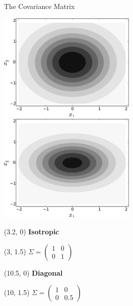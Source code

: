 \documentclass[pdf]{beamer}
\begin{document}
\begin{frame}{The Covariance Matrix}
\begin{center}
	\includegraphics[width=0.5\textwidth]{Gaussian2DContour1.pdf}
	\includegraphics[width=0.5\textwidth]{Gaussian2DContour2.pdf}
\end{center}

\begin{textblock}{8}(3.2, 0) %
\textbf{Isotropic}
\end{textblock}

\begin{textblock}{8}(3, 1.5) %
$\Sigma = 
\begin{pmatrix}
1 & 0\\
0 & 1
\end{pmatrix}
$
\end{textblock}

\begin{textblock}{8}(10.5, 0) %
\textbf{Diagonal}
\end{textblock}

\begin{textblock}{8}(10, 1.5) %
$\Sigma = 
\begin{pmatrix}
1 & 0\\
0 & 0.5
\end{pmatrix}
$
\end{textblock}

\begin{center}
\end{center}
\end{frame}
\end{document}
